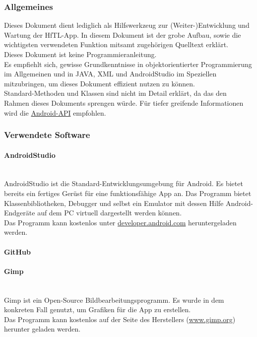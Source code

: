 \subsubsection{Allgemeines}
Dieses Dokument dient lediglich als Hilfswerkzeug zur (Weiter-)Entwicklung und Wartung der HfTL-App. In diesem Dokument ist der grobe Aufbau, sowie die wichtigsten verwendeten Funktion mitsamt zugehörigen Quelltext erklärt.
\\[1em]
Dieses Dokument ist keine Programmieranleitung.
\\[1em]
Es empfiehlt sich, gewisse Grundkenntnisse in objektorientierter Programmierung im Allgemeinen und  in JAVA, XML und AndroidStudio im Speziellen mitzubringen, um dieses Dokument effizient nutzen zu können.
\\[1em]
Standard-Methoden und Klassen sind nicht im Detail erklärt, da das den Rahmen dieses Dokuments sprengen würde. Für tiefer greifende Informationen wird die \href{http://developer.android.com/reference/packages.html}{Android-API} empfohlen.


\subsubsection{Verwendete Software}
\paragraph{AndroidStudio}
\ \\[1em]
AndroidStudio ist die Standard-Entwicklungsumgebung für Android. Es bietet bereits ein fertiges Gerüst für eine funktionsfähige App an. Das Programm bietet Klassenbibliotheken, Debugger und selbst ein Emulator mit dessen Hilfe Android-Endgeräte auf dem PC virtuell dargestellt werden können.\\
Das Programm kann kostenlos unter \href{https://developer.android.com/sdk/index.html}{developer.android.com} heruntergeladen werden.



\paragraph{GitHub}
\paragraph{Gimp}
\ \\[1em]
Gimp ist ein Open-Source Bildbearbeitungsprogramm. Es wurde in dem konkreten Fall genutzt, um Grafiken für die App zu erstellen.\\
Das Programm kann kostenlos auf der Seite des Herstellers  (\href{http://www.gimp.org/downloads/}{www.gimp.org}) herunter geladen werden.

